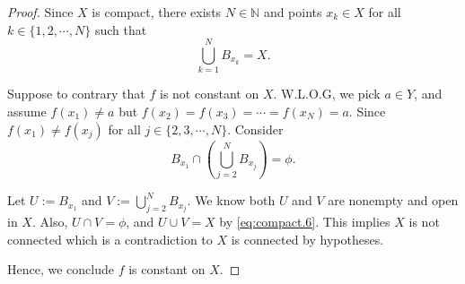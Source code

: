 \begin{Exercise}
\begin{proof}
Since $X$ is compact, there exists $N\in\mathbb{N}$ and points $x_k\in X$ for all $k\in\{1,2,\cdots,N\}$ such that
\begin{equation}\label{eq:compact.6}
\bigcup_{k=1}^{N} B_{x_k} = X.
\end{equation}

Suppose to contrary that $f$ is not constant on $X$. W.L.O.G, we pick $a\in Y$, and assume $f(x_1) \neq a$ but $f(x_2) = f(x_3) = \cdots = f(x_N) = a$.
Since $f(x_1) \neq f(x_j)$ for all $j\in\{2,3,\cdots,N\}$. Consider
$$
B_{x_1}\cap \left( \bigcup_{j=2}^{N} B_{x_j} \right) = \phi.
$$

Let $U := B_{x_1}$ and $V := \bigcup_{j=2}^{N} B_{x_j}$. We know both $U$ and $V$ are nonempty and open in $X$. Also, $U\cap V=\phi$, and $U\cup V = X$ by \eqref{eq:compact.6}. This implies $X$ is not connected which is a contradiction to $X$ is connected by hypotheses.

Hence, we conclude $f$ is constant on $X$.
\end{proof}
\end{Exercise}